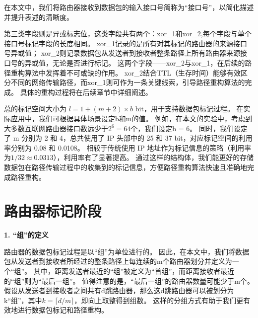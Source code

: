 在本文中，我们将路由器接收到数据包的输入接口号简称为“接口号”，以简化描述并提升表述的清晰度。
\par


第三类字段则是异或标志位，这类字段共有两个：xor\_1和xor\_2,每个字段与单个接口号标记字段的长度相同。
xor\_1记录的是所有对其标记的路由器的来源接口号异或值；
xor\_2则记录数据包从发送者到接收者整条路径上所有路由器来源接口号的异或值，无论是否进行标记。
这两个字段——xor\_2与xor\_1，在后续的路径重构算法中发挥着不可或缺的作用。
xor\_2结合TTL（生存时间）能够有效区分不同的网络传输路径，而xor\_1则可作为一条关键线索，引导路径重构算法的完成。
具体的重构过程将在后续章节中详细阐述。\par

总的标记空间大小为 $l = 1 + (m + 2) \times b$ bit，用于支持数据包标记过程。
在实际应用中，我们可根据具体场景设定b和m的值。
例如，在本文的实验中，考虑到大多数互联网路由器接口数远少于$2^6 =64$个，我们设定b = 6。
同时，我们设定了 m 分别为 2 和 4，总共使用了 IP 头部中的 25 和 37 bit，对应标记空间的利用率分别为 0.08 和 0.0108。
相较于传统使用 IP 地址作为标记信息的策略（利用率为$1/32 \approx 0.0313$），利用率有了显著提高。
通过这样的结构体，我们能更好的存储数据包在路径传输过程中的收集到的标记信息，方便路径重构算法快速且准确地完成路径重构。\par



% 


\section{路由器标记阶段}
\textbf{1. “组”的定义}\par
路由器的数据包标记过程是以“组”为单位进行的。
因此，在本文中，我们将数据包从发送者到接收者所经过的整条路径上每连续的m个路由器划分并定义为一个“组”。
其中，距离发送者最近的“组”被定义为“首组”，而距离接收者最近的“组”则为“最后一组”。
值得注意的是，“最后一组”的路由器数量可能少于m个。
假设从发送者到接收者之间共有d跳路由器，那么这d跳路由器可以被划分为k“组”，其中$k=\lceil d/m \rceil$，即向上取整得到组数。
这样的分组方式有助于我们更有效地进行数据包标记和路径重构。\par

